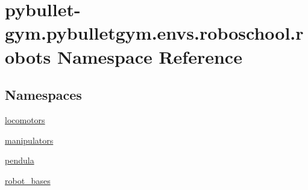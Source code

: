 \hypertarget{namespacepybullet-gym_1_1pybulletgym_1_1envs_1_1roboschool_1_1robots}{}\section{pybullet-\/gym.pybulletgym.\+envs.\+roboschool.\+robots Namespace Reference}
\label{namespacepybullet-gym_1_1pybulletgym_1_1envs_1_1roboschool_1_1robots}
\subsection*{Namespaces}
\begin{DoxyCompactItemize}
\item 
 \hyperlink{namespacepybullet-gym_1_1pybulletgym_1_1envs_1_1roboschool_1_1robots_1_1locomotors}{locomotors}
\item 
 \hyperlink{namespacepybullet-gym_1_1pybulletgym_1_1envs_1_1roboschool_1_1robots_1_1manipulators}{manipulators}
\item 
 \hyperlink{namespacepybullet-gym_1_1pybulletgym_1_1envs_1_1roboschool_1_1robots_1_1pendula}{pendula}
\item 
 \hyperlink{namespacepybullet-gym_1_1pybulletgym_1_1envs_1_1roboschool_1_1robots_1_1robot__bases}{robot\+\_\+bases}
\end{DoxyCompactItemize}

